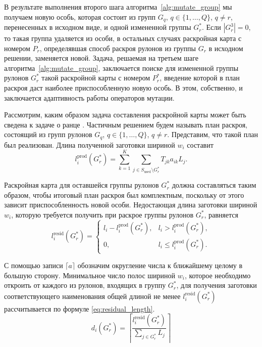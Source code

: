 \documentclass[12pt]{article}
\begin{document}
В результате выполнения второго шага алгоритма~\ref{alg:mutate_group} 
мы получаем новую 
особь, которая состоит из групп $G_q$, $q \in \{1,\ldots,Q\}$, $q \neq r$, 
перенесенных в исходном виде, и одной измененной группы $G_r^*$. Если 
$|G_r^3|=0$, то такая группа удаляется из особи, в остальных случаях 
раскройная карта с номером $P_r$, определявшая способ раскроя рулонов из 
группы $G_r$ в исходном решении, заменяется новой. Задача, решаемая на третьем 
шаге алгоритма~\ref{alg:mutate_group}, заключается поиске для измененной 
группы рулонов $G_r^*$ такой 
раскройной карты с номером $P_r^*$, введение которой в план раскроя даст 
наиболее приспособленную новую особь. В этом, собственно, и заключается 
адаптивность работы операторов мутации.

Рассмотрим, каким образом задача составления раскройной карты может быть 
сведена к задаче о ранце 
\cite{martello90}. 
Частичным решением будем называть план 
раскроя, состоящий из групп рулонов $G_q$, $q \in \{1,\ldots,Q\}$, $q \neq r$. 
Представим, что такой план был реализован. Длина полученной заготовки шириной 
$w_i$ составит
\[ l_{i}^{\text{prod}}(G_r^*)=\sum_{k=1}^{K} \sum_{j \in S_{\text{used}} \setminus G_r^*} T_{jk} a_{ik} L_j. \]

Раскройная карта для оставшейся группы рулонов $G_r^*$ должна составляться 
таким образом, чтобы итоговый план раскроя был комплектным, поскольку от этого 
зависит приспособленность новой особи. Недостающая длина заготовки шириной 
$w_i$, которую требуется получить при раскрое группы рулонов $G_r^*$, равняется
\[ l_{i}^{\text{resid}}(G_r^*)=
    \begin{cases}
        l_i-l_{i}^{\text{prod}}(G_r^*), & l_i > l_{i}^{\text{prod}}(G_r^*), \\
        0, & l_i \leq l_{i}^{\text{prod}}(G_r^*).
    \end{cases} \]

С помощью записи $\lceil a \rceil$ обозначим округление числа к ближайшему 
целому в большую сторону. Минимальное число полос шириной $w_i$, которое 
необходимо откроить от каждого из рулонов, входящих в группу $G_r^*$, для 
получения заготовки соответствующего наименования общей длиной не менее 
$l_{i}^{\text{resid}}(G_r^*)$ рассчитывается по формуле 
\eqref{eq:residual_length}.
\begin{equation}\label{eq:residual_length}
d_i(G_r^*)=\left\lceil \frac{l_{i}^{\text{resid}}(G_r^*)}
                            {\sum_{j \in G_r^*} L_j} \right\rceil    
\end{equation}
    
\end{document}
